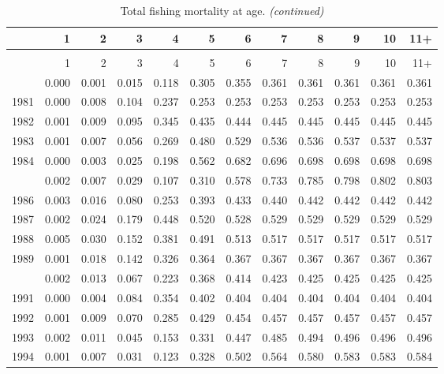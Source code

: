 \documentclass[
]{article}
\begin{document}
\begin{longtable}[t]{lrrrrrrrrrrr}
\caption{\label{tab:FAA-tot-table}Total fishing mortality at age.}\\
\toprule
  & 1 & 2 & 3 & 4 & 5 & 6 & 7 & 8 & 9 & 10 & 11+\\
\midrule
\endfirsthead
\caption[]{Total fishing mortality at age. \textit{(continued)}}\\
\toprule
  & 1 & 2 & 3 & 4 & 5 & 6 & 7 & 8 & 9 & 10 & 11+\\
\midrule
\endhead

\endfoot
\bottomrule
\endlastfoot
1980 & 0.000 & 0.001 & 0.015 & 0.118 & 0.305 & 0.355 & 0.361 & 0.361 & 0.361 & 0.361 & 0.361\\
1981 & 0.000 & 0.008 & 0.104 & 0.237 & 0.253 & 0.253 & 0.253 & 0.253 & 0.253 & 0.253 & 0.253\\
1982 & 0.001 & 0.009 & 0.095 & 0.345 & 0.435 & 0.444 & 0.445 & 0.445 & 0.445 & 0.445 & 0.445\\
1983 & 0.001 & 0.007 & 0.056 & 0.269 & 0.480 & 0.529 & 0.536 & 0.536 & 0.537 & 0.537 & 0.537\\
1984 & 0.000 & 0.003 & 0.025 & 0.198 & 0.562 & 0.682 & 0.696 & 0.698 & 0.698 & 0.698 & 0.698\\
\addlinespace
1985 & 0.002 & 0.007 & 0.029 & 0.107 & 0.310 & 0.578 & 0.733 & 0.785 & 0.798 & 0.802 & 0.803\\
1986 & 0.003 & 0.016 & 0.080 & 0.253 & 0.393 & 0.433 & 0.440 & 0.442 & 0.442 & 0.442 & 0.442\\
1987 & 0.002 & 0.024 & 0.179 & 0.448 & 0.520 & 0.528 & 0.529 & 0.529 & 0.529 & 0.529 & 0.529\\
1988 & 0.005 & 0.030 & 0.152 & 0.381 & 0.491 & 0.513 & 0.517 & 0.517 & 0.517 & 0.517 & 0.517\\
1989 & 0.001 & 0.018 & 0.142 & 0.326 & 0.364 & 0.367 & 0.367 & 0.367 & 0.367 & 0.367 & 0.367\\
\addlinespace
1990 & 0.002 & 0.013 & 0.067 & 0.223 & 0.368 & 0.414 & 0.423 & 0.425 & 0.425 & 0.425 & 0.425\\
1991 & 0.000 & 0.004 & 0.084 & 0.354 & 0.402 & 0.404 & 0.404 & 0.404 & 0.404 & 0.404 & 0.404\\
1992 & 0.001 & 0.009 & 0.070 & 0.285 & 0.429 & 0.454 & 0.457 & 0.457 & 0.457 & 0.457 & 0.457\\
1993 & 0.002 & 0.011 & 0.045 & 0.153 & 0.331 & 0.447 & 0.485 & 0.494 & 0.496 & 0.496 & 0.496\\
1994 & 0.001 & 0.007 & 0.031 & 0.123 & 0.328 & 0.502 & 0.564 & 0.580 & 0.583 & 0.583 & 0.584\\

\end{longtable}
\end{document}
